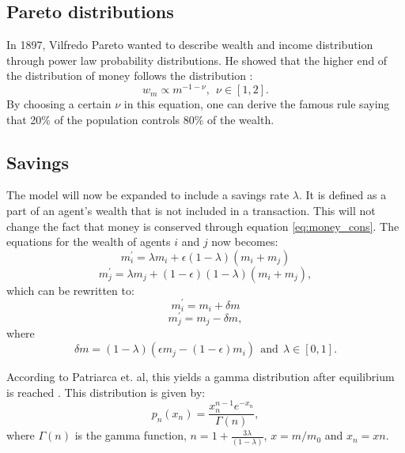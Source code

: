 \documentclass[11pt,a4paper,titlepage]{article}
\begin{document}
\subsection{Pareto distributions}
In 1897, Vilfredo Pareto wanted to describe wealth and income distribution through power law probability distributions. He showed that the higher end of the distribution of money follows the distribution \cite{Pareto}:
\begin{equation}
\label{eq:pareto_dist}
w_m \propto m^{-1-\nu}, \ \ \nu\in [1,2].
\end{equation}
By choosing a certain $\nu$ in this equation, one can derive the famous rule saying that 20\% of the population controls 80\% of the wealth.

\subsection{Savings}
The model will now be expanded to include a savings rate $\lambda$. It is defined as a part of an agent's wealth that is not included in a transaction. This will not change the fact that money is conserved through equation \ref{eq:money_cons}. The equations for the wealth of agents $i$ and $j$ now becomes:
\begin{equation}
m^{'}_{i} = \lambda m_i + \epsilon(1-\lambda)(m_i + m_j)
\end{equation}
\begin{equation}
m^{'}_j = \lambda m_j + (1-\epsilon)(1-\lambda)(m_i + m_j),
\end{equation}
which can be rewritten to:
\begin{equation}
m_i^{'} = m_i + \delta m
\end{equation}
\begin{equation}
m_j^{'} = m_{j} - \delta m,
\end{equation}
where
\begin{equation}
\delta m = (1-\lambda)(\epsilon m_j - (1-\epsilon)m_i) \ \ \textrm{and} \ \ \lambda \in [0,1].
\end{equation}

According to Patriarca et. al, this yields a gamma distribution after equilibrium is reached \cite{Patriarca}. This distribution is given by:
\begin{equation}
p_n (x_n) = \frac{x_n^{n-1}e^{-x_n}}{\Gamma (n)},
\end{equation}
where $\Gamma(n)$ is the gamma function, $n = 1 + \frac{3\lambda}{(1-\lambda)}$, $x = m/m_0$ and $x_n = xn$.
\end{document}

